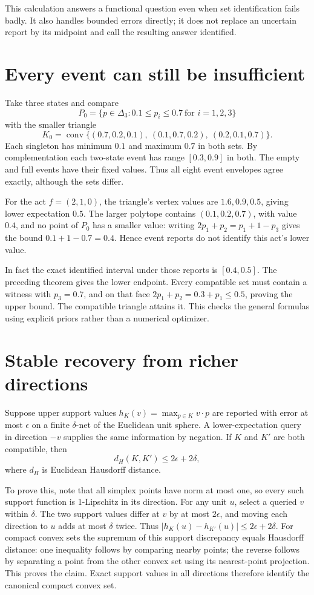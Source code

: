 \documentclass[11pt]{article}
\begin{document}
This calculation answers a functional question even when set identification fails badly. It also handles bounded errors directly; it does not replace an uncertain report by its midpoint and call the resulting answer identified.

\section*{Every event can still be insufficient}
Take three states and compare
\[
 P_0=\{p\in\Delta_3:0.1\leq p_i\leq0.7\ \text{for }i=1,2,3\}
\]
with the smaller triangle
\[
 K_0=\operatorname{conv}\{(0.7,0.2,0.1),\ (0.1,0.7,0.2),\ (0.2,0.1,0.7)\}.
\]
Each singleton has minimum $0.1$ and maximum $0.7$ in both sets. By complementation each two-state event has range $[0.3,0.9]$ in both. The empty and full events have their fixed values. Thus all eight event envelopes agree exactly, although the sets differ.

For the act $f=(2,1,0)$, the triangle's vertex values are $1.6,0.9,0.5$, giving lower expectation $0.5$. The larger polytope contains $(0.1,0.2,0.7)$, with value $0.4$, and no point of $P_0$ has a smaller value: writing $2p_1+p_2=p_1+1-p_3$ gives the bound $0.1+1-0.7=0.4$. Hence event reports do not identify this act's lower value.

In fact the exact identified interval under those reports is $[0.4,0.5]$. The preceding theorem gives the lower endpoint. Every compatible set must contain a witness with $p_3=0.7$, and on that face $2p_1+p_2=0.3+p_1\leq0.5$, proving the upper bound. The compatible triangle attains it. This checks the general formulas using explicit priors rather than a numerical optimizer.

\section*{Stable recovery from richer directions}
Suppose upper support values $h_K(v)=\max_{p\in K}v\cdot p$ are reported with error at most $\epsilon$ on a finite $\delta$-net of the Euclidean unit sphere. A lower-expectation query in direction $-v$ supplies the same information by negation. If $K$ and $K'$ are both compatible, then
\[
 d_H(K,K')\leq2\epsilon+2\delta,
\]
where $d_H$ is Euclidean Hausdorff distance.

To prove this, note that all simplex points have norm at most one, so every such support function is 1-Lipschitz in its direction. For any unit $u$, select a queried $v$ within $\delta$. The two support values differ at $v$ by at most $2\epsilon$, and moving each direction to $u$ adds at most $\delta$ twice. Thus $|h_K(u)-h_{K'}(u)|\leq2\epsilon+2\delta$. For compact convex sets the supremum of this support discrepancy equals Hausdorff distance: one inequality follows by comparing nearby points; the reverse follows by separating a point from the other convex set using its nearest-point projection. This proves the claim. Exact support values in all directions therefore identify the canonical compact convex set.
\end{document}
